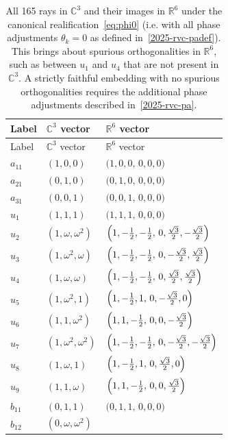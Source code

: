 \documentclass[%
  reprint,
  superscriptaddress,
  amsmath,amssymb,
  pra,
  floatfix,
  longbibliography
]{revtex4-2}
\begin{document}
\begingroup
\renewcommand{\arraystretch}{1.5} %
\begin{longtable}{lll}
\caption{All 165 rays in $\mathbb{C}^3$ and their images in $\mathbb{R}^6$
under the canonical realification~\eqref{eq:phi0} (i.e. with all phase adjustments $\theta_k=0 $ as defined in~\eqref{2025-rvc-padef}).
This brings about spurious orthogonalities in $\mathbb{R}^6$, such as between $u_{1}$ and $u_{4}$ that are not present in $\mathbb{C}^3$. A strictly faithful embedding with no spurious orthogonalities requires the additional phase adjustments described in~\eqref{2025-rvc-pa}.}
\label{tab:all-vectors}\\
\hline\hline
Label & $\mathbb{C}^3$ vector & $\mathbb{R}^6$ vector \\
\hline
\endfirsthead
\hline\hline
Label & $\mathbb{C}^3$ vector & $\mathbb{R}^6$ vector \\
\hline
\endhead
\hline\hline
\endfoot
$a_{11}$ & $(1,0,0)$ &
$\bigl(1,0,0,\,0,0,0\bigr)$ \\
$a_{21}$ & $(0,1,0)$ &
$\bigl(0,1,0,\,0,0,0\bigr)$ \\
$a_{31}$ & $(0,0,1)$ &
$\bigl(0,0,1,\,0,0,0\bigr)$ \\
$u_{1}$ & $(1,1,1)$ &
$\bigl(1,1,1,\,0,0,0\bigr)$ \\
$u_{2}$ & $(1,\omega,\omega^2)$ &
$\Bigl(1,-\tfrac12,-\tfrac12,\,0,\tfrac{\sqrt{3}}{2},-\tfrac{\sqrt{3}}{2}\Bigr)$ \\
$u_{3}$ & $(1,\omega^2,\omega)$ &
$\Bigl(1,-\tfrac12,-\tfrac12,\,0,-\tfrac{\sqrt{3}}{2},\tfrac{\sqrt{3}}{2}\Bigr)$ \\
$u_{4}$ & $(1,\omega,\omega)$ &
$\Bigl(1,-\tfrac12,-\tfrac12,\,0,\tfrac{\sqrt{3}}{2},\tfrac{\sqrt{3}}{2}\Bigr)$ \\
$u_{5}$ & $(1,\omega^2,1)$ &
$\Bigl(1,-\tfrac12,1,\,0,-\tfrac{\sqrt{3}}{2},0\Bigr)$ \\
$u_{6}$ & $(1,1,\omega^2)$ &
$\Bigl(1,1,-\tfrac12,\,0,0,-\tfrac{\sqrt{3}}{2}\Bigr)$ \\
$u_{7}$ & $(1,\omega^2,\omega^2)$ &
$\Bigl(1,-\tfrac12,-\tfrac12,\,0,-\tfrac{\sqrt{3}}{2},-\tfrac{\sqrt{3}}{2}\Bigr)$ \\
$u_{8}$ & $(1,\omega,1)$ &
$\Bigl(1,-\tfrac12,1,\,0,\tfrac{\sqrt{3}}{2},0\Bigr)$ \\
$u_{9}$ & $(1,1,\omega)$ &
$\Bigl(1,1,-\tfrac12,\,0,0,\tfrac{\sqrt{3}}{2}\Bigr)$ \\
$b_{11}$ & $(0,1,1)$ &
$\bigl(0,1,1,\,0,0,0\bigr)$ \\
$b_{12}$ & $(0,\omega,\omega^2)$ &

\end{longtable}
\end{document}
